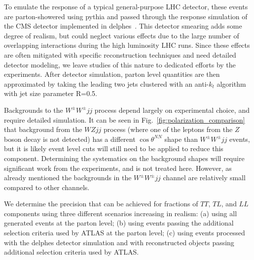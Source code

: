 \documentclass[aps,prl,twocolumn,showpacs,superscriptaddress,groupeaddress,floatfix]{revtex4}
\def\ssWW{\ensuremath{ W^{\pm}W^{\pm}jj }\xspace}
\def\tsNN{\ensuremath{ \theta^{NN} }\xspace}
\def\ctsNN{\ensuremath{ \cos\tsNN }\xspace}
\begin{document}
To emulate the response of a typical general-purpose LHC detector,
these events are parton-showered using {\sc pythia}\cite{pythia} and
passed through the response simulation of the CMS detector implemented
in {\sc delphes}~\cite{delphes}. This detector smearing adds some
degree of realism, but could neglect various effects due to the large
number of overlapping interactions during the high luminosity LHC
runs. Since these effects are often mitigated with specific
reconstruction techniques and need detailed detector modeling, we
leave studies of this nature to dedicated efforts by the experiments.
After detector simulation, parton level quantities are then
approximated by taking the leading two jets clustered with an
anti-$k_t$ algorithm~\cite{antikt} with jet size parameter R=0.5.


Backgrounds to the \ssWW process depend largely on experimental choice, and require detailed simulation. It can be seen in Fig.~\ref{fig:polarization_comparison} that background from the $WZjj$ process (where one of 
the leptons from the $Z$ boson decay is not detected) has a different \ctsNN shape than \ssWW events, but it is likely event level cuts will still need to be applied to reduce this component. Determining the systematics on the background shapes will require significant work from the experiments, and is not treated here. However, as already mentioned the backgrounds in the \ssWW channel are relatively small compared to other channels.


We determine the precision that can be achieved for fractions of $TT$, $TL$, and $LL$ components using three different scenarios increasing in realism: (a) using all  generated events at the parton level; 
(b) using events passing the additional selection criteria used by ATLAS at the parton level; 
(c) using events processed with the {\sc delphes} detector simulation and with reconstructed objects passing additional selection criteria used by \mbox{ATLAS}. 
\end{document}
